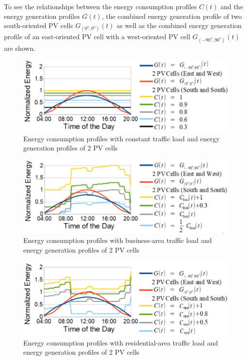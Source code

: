 To see the relationships between the energy consumption profiles $C(t)$ and the energy generation profiles $G(t)$, the combined energy generation profile of two south-oriented PV cells $G_{(0^\mathrm{o},0^\mathrm{o})}(t)$ as well as the combined energy generation profile of an east-oriented PV cell with a west-oriented PV cell $G_{(-90^\mathrm{o},90^\mathrm{o})}(t)$ are shown. 



\begin{figure}[H]
	\centering
		\includegraphics[width=1\columnwidth]{pictures/constant_allgemein3}
\caption{Energy consumption profiles with constant traffic load and energy generation profiles of 2 PV cells\label{constant_allgemein}}
\end{figure}


\begin{figure}[H]
	\centering
		\includegraphics[width=1\columnwidth]{pictures/business_allgemein3}
\caption{Energy consumption profiles with business-area traffic load and energy generation profiles of 2 PV cells\label{business_allgemein}}
\end{figure}

\begin{figure}[H]
	\centering
		\includegraphics[width=1\columnwidth]{pictures/residential_allgemein3}
\caption{Energy consumption profiles with residential-area traffic load and energy generation profiles of 2 PV cells\label{residential_allgemein}}
\end{figure}




